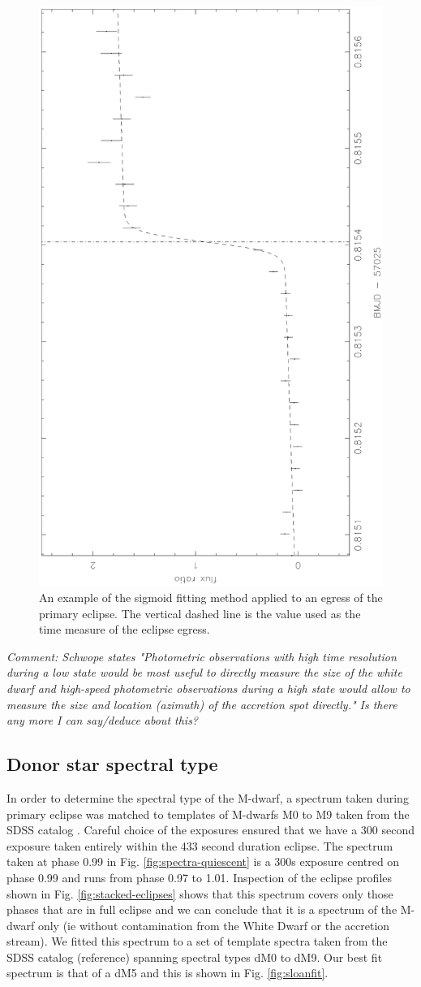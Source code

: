 \documentclass[a4paper,fleqn,usenatbib]{mnras}
\begin{document}
\begin{figure}
\centering
\includegraphics[height=\columnwidth, angle=270]{images/egress.eps}
\caption[Caption for egress]{An example of the sigmoid fitting method applied to an egress of the primary eclipse. The vertical dashed line is the value used as the time measure of the eclipse egress.}
\label{fig:egress}
\end{figure}

\emph{Comment: Schwope states "Photometric observations with high time resolution during a low state would be most useful to directly measure the size of the white dwarf and high-speed photometric observations during a high state would allow to measure the size and location (azimuth) of the accretion spot directly."  Is there any more I can say/deduce about this?}

\subsection{Donor star spectral type}
In order to determine the spectral type of the M-dwarf, a spectrum taken during primary eclipse was matched to templates of M-dwarfs M0 to M9 taken from the SDSS catalog \citep{Bochanski2007}. Careful choice of the exposures ensured that we have a 300 second exposure taken entirely within the 433 second duration eclipse. The spectrum taken at phase 0.99 in Fig. \ref{fig:spectra-quiescent} is a 300s exposure centred on phase 0.99 and runs from phase 0.97 to 1.01.  Inspection of the eclipse profiles shown in Fig. \ref{fig:stacked-eclipses} shows that this spectrum covers only those phases that are in full eclipse and we can conclude that it is a spectrum of the M-dwarf only (ie without contamination from the White Dwarf or the accretion stream). We fitted this spectrum to a set  of template spectra taken from the SDSS catalog (reference) spanning spectral types dM0 to dM9. Our best fit spectrum is that of a dM5 and this is shown in Fig. \ref{fig:sloanfit}. 
\end{document}

